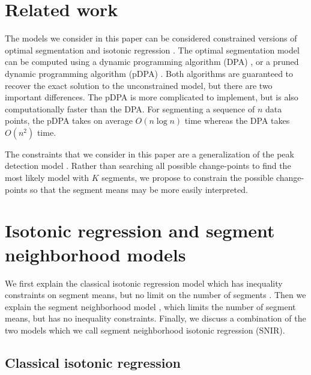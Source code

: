 \documentclass{article}
\begin{document}
\section{Related work}
\label{sec:related}

The models we consider in this paper can be considered constrained
versions of optimal segmentation \citep{Segmentor} and isotonic
regression \citep{mair2009isotone}. The optimal segmentation model can
be computed using a dynamic programming algorithm (DPA)
\citep{bellman, segment-neighborhood, optimal-partitioning}, or a
pruned dynamic programming algorithm (pDPA) \citep{pruned-dp}. Both
algorithms are guaranteed to recover the exact solution to the
unconstrained model, but there are two important differences. The pDPA
is more complicated to implement, but is also computationally faster
than the DPA. For segmenting a sequence of $n$ data points, the pDPA
takes on average $O(n\log n)$ time whereas the DPA takes $O(n^2)$
time.

The constraints that we consider in this paper are a generalization of
the peak detection model \citep{HOCKING-PeakSeg}. Rather than
searching all possible change-points to find the most likely model
with $K$ segments, we propose to constrain the possible change-points
so that the segment means may be more easily interpreted.

\section{Isotonic regression and segment neighborhood models}

We first explain the classical isotonic regression model which has
inequality constraints on segment means, but no limit on the number of
segments \citep{mair2009isotone}. Then we explain the segment
neighborhood model \citep{segment-neighborhood}, which limits the
number of segment means, but has no inequality constraints. Finally,
we discuss a combination of the two models which we call segment
neighborhood isotonic regression (SNIR).

\subsection{Classical isotonic regression}
\end{document}
